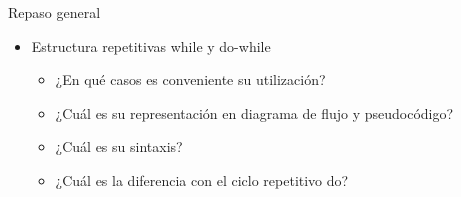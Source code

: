 \documentclass[xcolor=pdftex,table,11pt]{beamer}
\begin{document}
\begin{frame}[allowframebreaks]{Repaso general}
\begin{itemize}
			\item Estructura repetitivas while y do-while
		\begin{itemize}
		\item  ¿En qué casos es conveniente su utilización?
	    \item  ¿Cuál es su representación en diagrama de flujo y pseudocódigo?
		\item  ¿Cuál es su sintaxis?
		\item  ¿Cuál es la diferencia con el ciclo repetitivo do?
	\end{itemize}
	
\end{itemize}
\end{frame}
\end{document}
